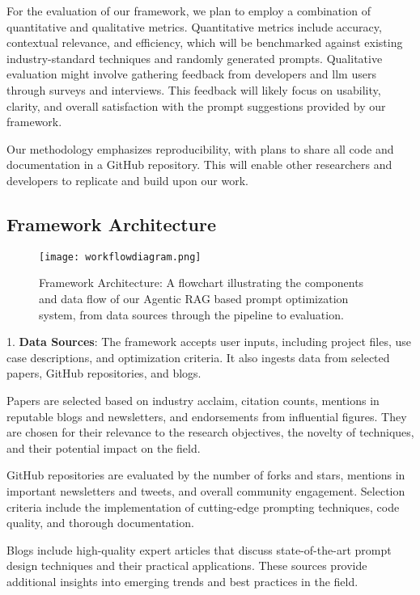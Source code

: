 \documentclass[12pt,twoside,english]{article}
\begin{document}
For the evaluation of our framework, we plan to employ a combination of quantitative and qualitative metrics. Quantitative metrics include accuracy, contextual relevance, and efficiency, which will be benchmarked against existing industry-standard techniques and randomly generated prompts. Qualitative evaluation might involve gathering feedback from developers and \gls{llm} users through surveys and interviews. This feedback will likely focus on usability, clarity, and overall satisfaction with the prompt suggestions provided by our framework.

Our methodology emphasizes reproducibility, with plans to share all code and documentation in a GitHub repository. This will enable other researchers and developers to replicate and build upon our work. 

\clearpage
\subsection{Framework Architecture}

\begin{figure}[ht!]
    \centering
    \texttt{[image: workflowdiagram.png]}
    \caption[\centering Framework Architecture]{\centering Framework Architecture: A flowchart illustrating the components and data flow of our Agentic RAG based prompt optimization system, from data sources through the pipeline to evaluation.}
    \label{fig:framework-architecture}
\end{figure}


1. \textbf{Data Sources}: The framework accepts user inputs, including project files, use case descriptions, and optimization criteria. It also ingests data from selected papers, GitHub repositories, and blogs.

Papers are selected based on industry acclaim, citation counts, mentions in reputable blogs and newsletters, and endorsements from influential figures. They are chosen for their relevance to the research objectives, the novelty of techniques, and their potential impact on the field.

GitHub repositories are evaluated by the number of forks and stars, mentions in important newsletters and tweets, and overall community engagement. Selection criteria include the implementation of cutting-edge prompting techniques, code quality, and thorough documentation.

Blogs include high-quality expert articles that discuss state-of-the-art prompt design techniques and their practical applications. These sources provide additional insights into emerging trends and best practices in the field.
\end{document}

